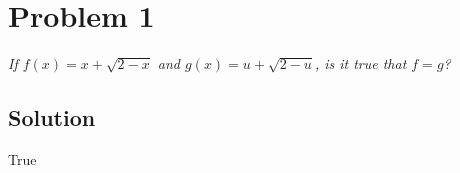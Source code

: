 \documentclass[11pt]{article}
\begin{document}
	
\section*{Problem 1}

\textit{If $f(x)=x+\sqrt{2-x}$ and $g(x)=u+\sqrt{2-u}$, is it true that $f=g$?}

\subsection*{Solution}

True
	
\end{document}
